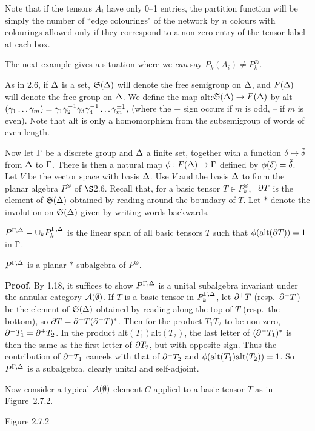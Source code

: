 Note that if the tensors $A_i$ have only 0--1 entries, the
partition function will be simply the number of ``edge colourings"
of the network by $n$ colours with colourings allowed only if they
correspond to a non-zero entry of the tensor label at each box.

The next example gives a situation where we {\it can} say
$P_k(A_i)\neq P^{\otimes}_k$.

As in 2.6, if $\Delta$ is a set, $\frak S(\Delta)$ will denote the free
semigroup on $\Delta$, and $F(\Delta)$ will denote the free group on $\Delta$.
We define the map
alt:$\frak S(\Delta)\to F(\Delta)$ by alt$(\gamma_1\dots\gamma_m)=
\gamma_1\gamma_2^{-1}\gamma_3\gamma_4^{-1}\dots \gamma_m^{\pm 1}$,
(where the $+$ sign occurs if $m$ is odd, -- if $m$ is
even). Note that alt is only a homomorphism from the subsemigroup
of words of even length.

Now let $\Gamma$ be a discrete group and $\Delta$ a finite set, together
with a function $\delta\mapsto\tilde{\delta}$ from $\Delta$ to $\Gamma$. There is
then a natural map $\phi: F(\Delta)\to\Gamma$ defined by
$\phi(\delta)=\tilde{\delta}$. Let
$V$ be the vector space with basis $\Delta$. Use $V$ and the basis $\Delta$
to form the planar algebra $P^{\otimes}$ of $\S$2.6. Recall that,
for a basic tensor
$T\in P^{\otimes}_k$, \ $\partial T$ is the element of $\frak S(\Delta)$
obtained by reading around the boundary of $T$. Let $*$ denote the
involution on $\frak S(\Delta)$ given by writing words backwards.

 $P^{\Gamma,\Delta}=\cup_k P_k^{\Gamma,\Delta}$ is the
linear span of all basic tensors $T$ such that
$\phi({\bf\rm{alt}}(\partial T))=1$ in $\Gamma$.

\ni{} $P^{\Gamma,\Delta}$ is a planar $*$-subalgebra
of $P^{\otimes}$.

\bs
{\bf Proof}. By 1.18, it suffices to show $P^{\Gamma,\Delta}$ is a unital
subalgebra invariant under the annular category ${\cal A} (\emptyset)$. If $T$ is a basic
tensor in $P_k^{\Gamma,\Delta}$, let $\partial^+T$ (resp.~$\partial^-T$) be the element
of $\frak S(\Delta)$ obtained by reading along the top of $T$
(resp.~the bottom), so $\partial T=\partial^+ T(\partial^-T)^*$. Then for the
product $T_1T_2$ to be non-zero, $\partial^-T_1=\partial^+T_2$.
In the product alt$(T_1)$alt$(T_2)$, the last letter of
$(\partial^-T_1)^*$ is then the same as the first letter of $\partial T_2$, but
with opposite sign. Thus the contribution of $\partial^-T_1$ cancels with
that of $\partial^+T_2$ and $\phi({\bf\rm{alt}}(T_1){\bf\rm{alt}}(T_2))=1$.
So $P^{\Gamma,\Delta}$ is a subalgebra, clearly unital and self-adjoint.

Now consider a typical ${\cal A} (\emptyset)$ element $C$ applied to a basic tensor
$T$ as in Figure~2.7.2. 
\[
	
\]
\begin{center}
 	Figure 2.7.2
\end{center}

